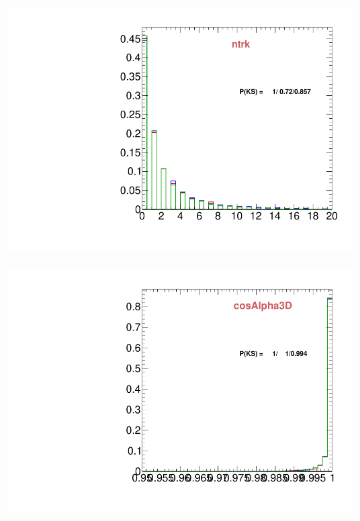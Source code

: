 \begin{figure}
        \centering
        \begin{subfigure}[b]{0.2\textwidth}
                \centering
                \includegraphics[width=\textwidth]{Figures/VariablesComparison/MC_endcaps_figs_3h/ntrk}
                \label{fig:MC_endcaps_ntrk_3h}
        \end{subfigure}
        \begin{subfigure}[b]{0.2\textwidth}
                \centering
                \includegraphics[width=\textwidth]{Figures/VariablesComparison/MC_endcaps_figs_3h/cosAlpha3D}
                \label{fig:MC_endcaps_cosAlpha3D_3h}
        \end{subfigure}
        \begin{subfigure}[b]{0.2\textwidth}
                \centering

\end{subfigure}
\end{figure}
